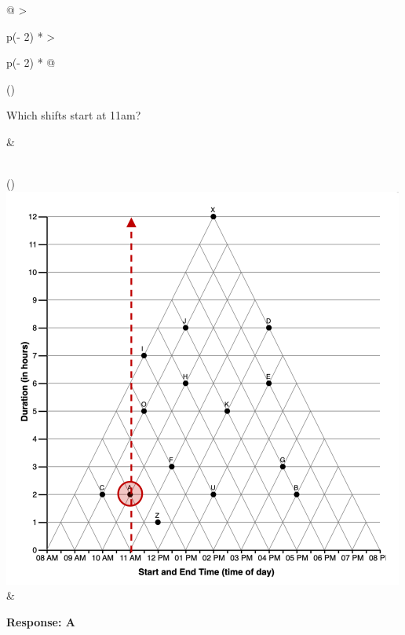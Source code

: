 \documentclass[
  letterpaper,
  DIV=11,
  numbers=noendperiod]{scrreprt}
\begin{document}
\begin{longtable}[]{@{}
  >{\raggedright\arraybackslash}p{(\columnwidth - 2\tabcolsep) * }
  >{\raggedright\arraybackslash}p{(\columnwidth - 2\tabcolsep) * }@{}}
\toprule()
\begin{minipage}[b]{\linewidth}\raggedright
Which shifts start at 11am?
\end{minipage} & \begin{minipage}[b]{\linewidth}\raggedright
\end{minipage} \\
\midrule()
\endhead
\includegraphics[width=5.20833in,height=\textheight]{analysis/SGC3A/static/interpretations/Q1_111_A.png}
& \begin{minipage}[t]{\linewidth}\raggedright
\textbf{Response: A}


\end{minipage}
\end{longtable}
\end{document}
